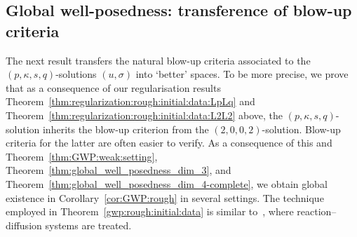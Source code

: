 \documentclass[reqno]{amsart}
\newcommand{\1}{\mathbf{1}}
\begin{document}
	\subsection{Global well-posedness: transference of blow-up criteria}
    The next result transfers the natural blow-up criteria associated to the $(p,\kappa,s,q)$-solutions $(u,\sigma)$ into `better' spaces. To be more precise, we prove that as a consequence of our regularisation results Theorem~\ref{thm:regularization:rough:initial:data:LpLq} and Theorem~\ref{thm:regularization:rough:initial:data:L2L2} above, the $(p,\kappa,s,q)$-solution inherits the blow-up criterion from the $(2,0,0,2)$-solution. Blow-up criteria for the latter are often easier to verify. 
    As a consequence of this and Theorem~\ref{thm:GWP:weak:setting}, Theorem~\ref{thm:global_well_posedness_dim_3}, and Theorem~\ref{thm:global_well_posedness_dim_4-complete}, we obtain global existence in Corollary~\ref{cor:GWP:rough} in several settings. The technique employed in Theorem~\ref{gwp:rough:initial:data} is similar to~\cite[Theorem 2.10]{agresti2023reactiondiffusion_local}, where reaction--diffusion systems are treated. 
\end{document}
